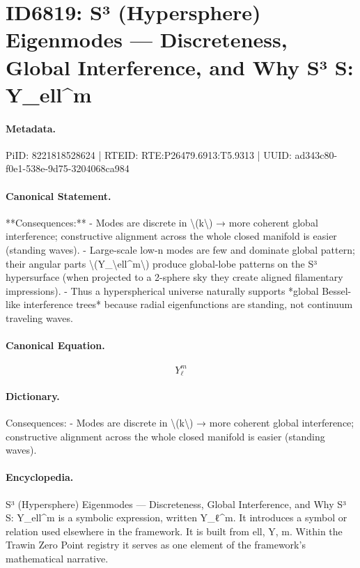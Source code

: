 \section*{ID6819: S³ (Hypersphere) Eigenmodes — Discreteness, Global Interference, and Why S³ S: Y\_ell\textasciicircum{}m}
\paragraph{Metadata.}
PiID: 8221818528624 | RTEID: RTE:P26479.6913:T5.9313 | UUID: ad343c80-f0e1-538e-9d75-3204068ca984

\paragraph{Canonical Statement.}
**Consequences:** - Modes are discrete in \textbackslash{}(k\textbackslash{}) → more coherent global interference; constructive alignment across the whole closed manifold is easier (standing waves). - Large-scale low-n modes are few and dominate global pattern; their angular parts \textbackslash{}(Y\_\textbackslash{}ell\textasciicircum{}m\textbackslash{}) produce global-lobe patterns on the S³ hypersurface (when projected to a 2-sphere sky they create aligned filamentary impressions). - Thus a hyperspherical universe naturally supports *global Bessel-like interference trees* because radial eigenfunctions are standing, not continuum traveling waves.

\paragraph{Canonical Equation.}
\[
Y_\ell^m
\]

\paragraph{Dictionary.}
Consequences: - Modes are discrete in \textbackslash{}(k\textbackslash{}) → more coherent global interference; constructive alignment across the whole closed manifold is easier (standing waves).

\paragraph{Encyclopedia.}
S³ (Hypersphere) Eigenmodes — Discreteness, Global Interference, and Why S³ S: Y\_ell\textasciicircum{}m is a symbolic expression, written Y\_ℓ\textasciicircum{}m. It introduces a symbol or relation used elsewhere in the framework. It is built from ell, Y, m. Within the Trawin Zero Point registry it serves as one element of the framework's mathematical narrative.
